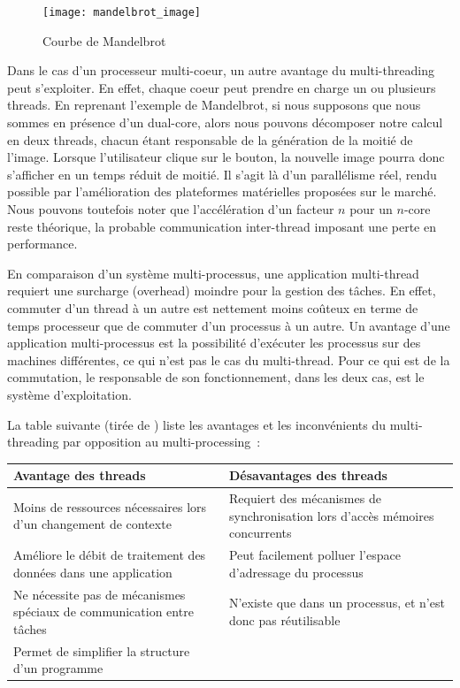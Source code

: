 \begin{figure}[ht]
  \begin{center}
    \texttt{[image: mandelbrot\_image]}
    \caption{\label{fig:mandelbrot}Courbe de Mandelbrot}
  \end{center}
\end{figure}

Dans le cas d'un processeur multi-coeur, un autre avantage du multi-threading peut s'exploiter. En effet, chaque coeur peut prendre en charge un ou plusieurs threads. En reprenant l'exemple de Mandelbrot, si nous supposons que nous sommes en présence d'un dual-core, alors nous pouvons décomposer notre calcul en deux threads, chacun étant responsable de la génération de la moitié de l'image. Lorsque l'utilisateur clique sur le bouton, la nouvelle image pourra donc s'afficher en un temps réduit de moitié. Il s'agit là d'un parallélisme réel, rendu possible par l'amélioration des plateformes matérielles proposées sur le marché. Nous pouvons toutefois noter que l'accélération d'un facteur $n$ pour un $n$-core reste théorique, la probable communication inter-thread imposant une perte en performance.

En comparaison d'un système multi-processus, une application multi-thread requiert une surcharge (overhead) moindre pour la gestion des tâches. En effet, commuter d'un thread à un autre est nettement moins coûteux en terme de temps processeur que de commuter d'un processus à un autre. Un avantage d'une application multi-processus est la possibilité d'exécuter les processus sur des machines différentes, ce qui n'est pas le cas du multi-thread. Pour ce qui est de la commutation, le responsable de son fonctionnement, dans les deux cas, est le système d'exploitation.

La table suivante (tirée de \cite{hughes03parallel}) liste les avantages et les inconvénients du multi-threading par opposition au multi-processing~:

\begin{center}
\begin{tabular}{p{}|p{}}
\toprule
\textbf{Avantage des threads} & \textbf{Désavantages des threads} \\
\midrule
Moins de ressources nécessaires lors d'un changement de contexte & Requiert des mécanismes de synchronisation lors d'accès mémoires concurrents \\
Améliore le débit de traitement des données dans une application & Peut facilement polluer l'espace d'adressage du processus \\
Ne nécessite pas de mécanismes spéciaux de communication entre tâches & N'existe que dans un processus, et n'est donc pas réutilisable \\
Permet de simplifier la structure d'un programme & \\
\bottomrule
\end{tabular}
\end{center}

